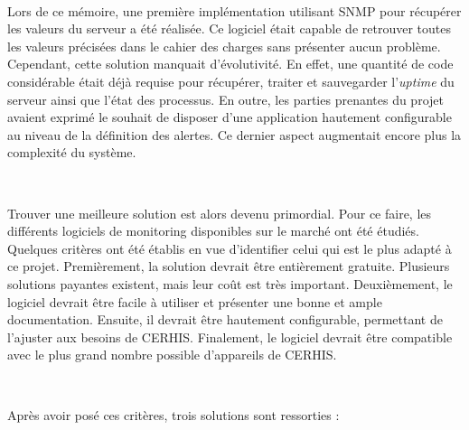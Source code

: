 ~

\noindent
Lors de ce mémoire, une première implémentation utilisant SNMP pour récupérer les valeurs du serveur a été réalisée. Ce logiciel était capable de retrouver toutes les valeurs précisées dans le cahier des charges sans présenter aucun problème. Cependant, cette solution manquait d’évolutivité. En effet, une quantité de code considérable était déjà requise pour récupérer, traiter et sauvegarder l’\textit{uptime} du serveur ainsi que l’état des processus. En outre, les parties prenantes du projet avaient exprimé le souhait de disposer d'une application hautement configurable au niveau de la définition des alertes. Ce dernier aspect augmentait encore plus la complexité du système.

~

\noindent
Trouver une meilleure solution est alors devenu primordial. Pour ce faire, les différents logiciels de monitoring disponibles sur le marché ont été étudiés. Quelques critères ont été établis en vue d’identifier celui qui est le plus adapté à ce projet. Premièrement, la solution devrait être entièrement gratuite. Plusieurs solutions payantes existent, mais leur coût est très important. Deuxièmement, le logiciel devrait être facile à utiliser et présenter une bonne et ample documentation. Ensuite, il devrait être hautement configurable, permettant de l’ajuster aux besoins de CERHIS. Finalement, le logiciel devrait être compatible avec le plus grand nombre possible d’appareils de CERHIS.

~

\noindent
Après avoir posé ces critères, trois solutions sont ressorties :

~

